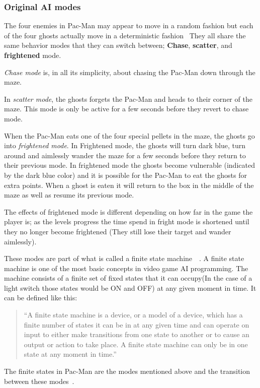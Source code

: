 
\subsubsection{Original AI modes} \label{sec:aimodes}
The four enemies in Pac-Man may appear to move in a random fashion but each of the four ghosts actually move in a deterministic fashion~\autocite{Pittman2011} They all share the same behavior modes that they can switch between; \textbf{Chase}, \textbf{scatter}, and \textbf{frightened} mode.

\emph{Chase mode} is, in all its simplicity, about chasing the Pac-Man down through the maze.

In \emph{scatter mode}, the ghosts forgets the Pac-Man and heads to their corner of the maze. This mode is only be active for a few seconds before they revert to chase mode.

When the Pac-Man eats one of the four special pellets in the maze, the ghosts go into \emph{frightened mode}. In Frightened mode, the ghosts will turn dark blue, turn around and aimlessly wander the maze for a few seconds before they return to their previous mode. In frightened mode the ghosts become vulnerable (indicated by the dark blue color) and it is possible for the Pac-Man to eat the ghosts for extra points. When a ghost is eaten it will return to the box in the middle of the maze as well as resume its previous mode.

The effects of frightened mode is different depending on how far in the game the player is; as the levels progress the time spend in fright mode is shortened until they no longer become frightened (They still lose their target and wander aimlessly).

These modes are part of what is called a finite state machine~\autocite[pp.44]{Buckland2005}~\autocite{Kehoe2009}.
A finite state machine is one of the most basic concepts in video game AI programming. The machine consists of a finite set of fixed states that it can occupy(In the case of a light switch those states would be ON and OFF) at any given moment in time. It can be defined like this:

\blockquote[\autocite{Buckland2005}]{\enquote{A finite state machine is a device, or a model of a device, which has a finite number of states it can be in at any given time and can operate on input to either make transitions from one state to another or to cause an output or action to take place. A finite state machine can only be in one state at any moment in time.}}

The finite states in Pac-Man are the modes mentioned above and the transition between these modes~\autocite[pp.45]{Buckland2005}.